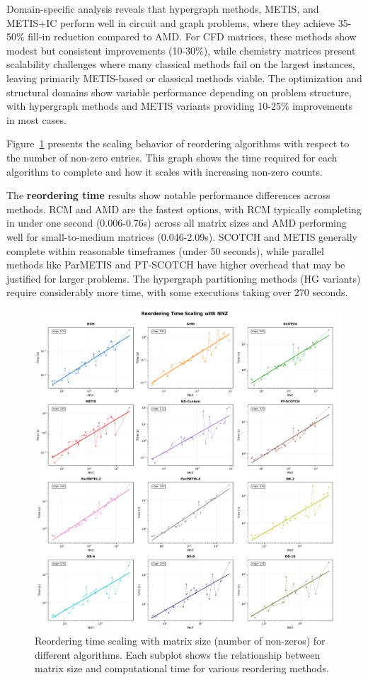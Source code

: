 Domain-specific analysis reveals that hypergraph methods, METIS, and METIS+IC perform well in circuit and graph problems, where they achieve 35-50\% fill-in reduction compared to AMD. For CFD matrices, these methods show modest but consistent improvements (10-30\%), while chemistry matrices present scalability challenges where many classical methods fail on the largest instances, leaving primarily METIS-based or classical methods viable. The optimization and structural domains show variable performance depending on problem structure, with hypergraph methods and METIS variants providing 10-25\% improvements in most cases.

Figure~\ref{fig:reorder-time-scaling} presents the scaling behavior of reordering algorithms with respect to the number of non-zero entries. This graph shows the time required for each algorithm to complete and how it scales with increasing non-zero counts. 

The \textbf{reordering time} results show notable performance differences across methods. RCM and AMD are the fastest options, with RCM typically completing in under one second (0.006-0.76s) across all matrix sizes and AMD performing well for small-to-medium matrices (0.046-2.09s). SCOTCH and METIS generally complete within reasonable timeframes (under 50 seconds), while parallel methods like ParMETIS and PT-SCOTCH have higher overhead that may be justified for larger problems. The hypergraph partitioning methods (HG variants) require considerably more time, with some executions taking over 270 seconds.

\begin{figure}[H]
\centering
\includegraphics[width=\textwidth]{fig/res/reorder_time_scaling.png}
\caption{Reordering time scaling with matrix size (number of non-zeros) for different algorithms. Each subplot shows the relationship between matrix size and computational time for various reordering methods.}
\label{fig:reorder-time-scaling}
\end{figure}

